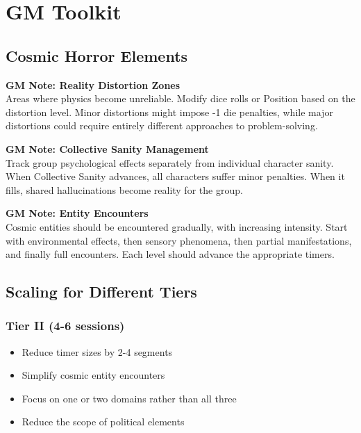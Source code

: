 \documentclass[12pt,twoside]{article}
\newenvironment{gmnote}[1]{%
  \begin{leftbar}%
  \textbf{GM Note: #1}\\%
}{\end{leftbar}}
\begin{document}
\section{GM Toolkit}

\subsection{Cosmic Horror Elements}

\begin{gmnote}{Reality Distortion Zones}
Areas where physics become unreliable. Modify dice rolls or Position based on the distortion level. Minor distortions might impose -1 die penalties, while major distortions could require entirely different approaches to problem-solving.
\end{gmnote}

\begin{gmnote}{Collective Sanity Management}
Track group psychological effects separately from individual character sanity. When Collective Sanity advances, all characters suffer minor penalties. When it fills, shared hallucinations become reality for the group.
\end{gmnote}

\begin{gmnote}{Entity Encounters}
Cosmic entities should be encountered gradually, with increasing intensity. Start with environmental effects, then sensory phenomena, then partial manifestations, and finally full encounters. Each level should advance the appropriate timers.
\end{gmnote}

\subsection{Scaling for Different Tiers}

\subsubsection{Tier II (4-6 sessions)}
\begin{itemize}[leftmargin=*]
\item Reduce timer sizes by 2-4 segments
\item Simplify cosmic entity encounters
\item Focus on one or two domains rather than all three
\item Reduce the scope of political elements
\end{itemize}
\end{document}
